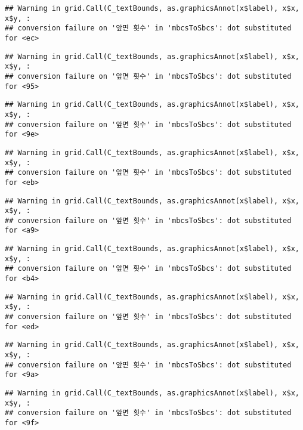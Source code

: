 \documentclass[]{book}
\begin{document}
\begin{verbatim}
## Warning in grid.Call(C_textBounds, as.graphicsAnnot(x$label), x$x, x$y, :
## conversion failure on '앞면 횟수' in 'mbcsToSbcs': dot substituted for <ec>
\end{verbatim}

\begin{verbatim}
## Warning in grid.Call(C_textBounds, as.graphicsAnnot(x$label), x$x, x$y, :
## conversion failure on '앞면 횟수' in 'mbcsToSbcs': dot substituted for <95>
\end{verbatim}

\begin{verbatim}
## Warning in grid.Call(C_textBounds, as.graphicsAnnot(x$label), x$x, x$y, :
## conversion failure on '앞면 횟수' in 'mbcsToSbcs': dot substituted for <9e>
\end{verbatim}

\begin{verbatim}
## Warning in grid.Call(C_textBounds, as.graphicsAnnot(x$label), x$x, x$y, :
## conversion failure on '앞면 횟수' in 'mbcsToSbcs': dot substituted for <eb>
\end{verbatim}

\begin{verbatim}
## Warning in grid.Call(C_textBounds, as.graphicsAnnot(x$label), x$x, x$y, :
## conversion failure on '앞면 횟수' in 'mbcsToSbcs': dot substituted for <a9>
\end{verbatim}

\begin{verbatim}
## Warning in grid.Call(C_textBounds, as.graphicsAnnot(x$label), x$x, x$y, :
## conversion failure on '앞면 횟수' in 'mbcsToSbcs': dot substituted for <b4>
\end{verbatim}

\begin{verbatim}
## Warning in grid.Call(C_textBounds, as.graphicsAnnot(x$label), x$x, x$y, :
## conversion failure on '앞면 횟수' in 'mbcsToSbcs': dot substituted for <ed>
\end{verbatim}

\begin{verbatim}
## Warning in grid.Call(C_textBounds, as.graphicsAnnot(x$label), x$x, x$y, :
## conversion failure on '앞면 횟수' in 'mbcsToSbcs': dot substituted for <9a>
\end{verbatim}

\begin{verbatim}
## Warning in grid.Call(C_textBounds, as.graphicsAnnot(x$label), x$x, x$y, :
## conversion failure on '앞면 횟수' in 'mbcsToSbcs': dot substituted for <9f>
\end{verbatim}
\end{document}
